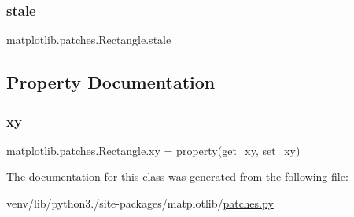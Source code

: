 \mbox{\label{classmatplotlib_1_1patches_1_1Rectangle_a96ab0b5fed1ee33aff151d16ab9078e7}} 
\subsubsection{\texorpdfstring{stale}{stale}}
{\footnotesize\ttfamily matplotlib.\+patches.\+Rectangle.\+stale}



\subsection{Property Documentation}
\mbox{\label{classmatplotlib_1_1patches_1_1Rectangle_a7febcd40cac82459d66c33ddfc6ba09f}} 
\subsubsection{\texorpdfstring{xy}{xy}}
{\footnotesize\ttfamily matplotlib.\+patches.\+Rectangle.\+xy = property(\hyperlink{classmatplotlib_1_1patches_1_1Rectangle_a4b017693949cd5ea9f162f168f8e0855}{get\+\_\+xy}, \hyperlink{classmatplotlib_1_1patches_1_1Rectangle_aba57bf8a9cd2c16f5b53412b4228e5c7}{set\+\_\+xy})\hspace{0.3cm}{\ttfamily [static]}}



The documentation for this class was generated from the following file\+:\begin{DoxyCompactItemize}
\item 
venv/lib/python3./site-\/packages/matplotlib/\hyperlink{patches_8py}{patches.\+py}\end{DoxyCompactItemize}
